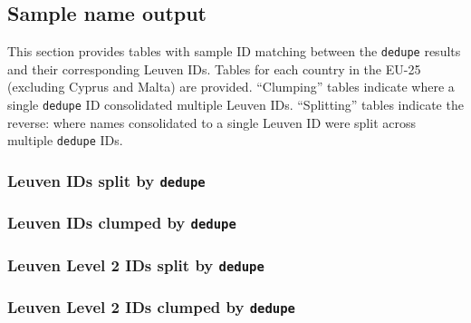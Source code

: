 \documentclass[11pt]{article}
\begin{document}
\subsection{Sample name output}
\label{sec:sample-name-output}

This section provides tables with sample ID matching between the
\texttt{dedupe} results and their corresponding Leuven IDs. Tables for
each country in the EU-25 (excluding Cyprus and Malta) are
provided. ``Clumping'' tables indicate where a single \texttt{dedupe}
ID consolidated multiple Leuven IDs. ``Splitting'' tables indicate the
reverse: where names consolidated to a single Leuven ID were split
across multiple \texttt{dedupe} IDs. 

\subsubsection{Leuven IDs split by \texttt{dedupe} }
\label{sec:leuven-ids-split}
\footnotesize


\subsubsection{Leuven IDs clumped by \texttt{dedupe}}
\label{sec:leuven-ids-clumped}

\footnotesize



\subsubsection{Leuven Level 2 IDs split by \texttt{dedupe}}
\label{sec:leuven-level-2}

\footnotesize


\subsubsection{Leuven Level 2 IDs clumped by \texttt{dedupe}}
\label{sec:leuven-level-2-1}

\footnotesize




\end{document}
